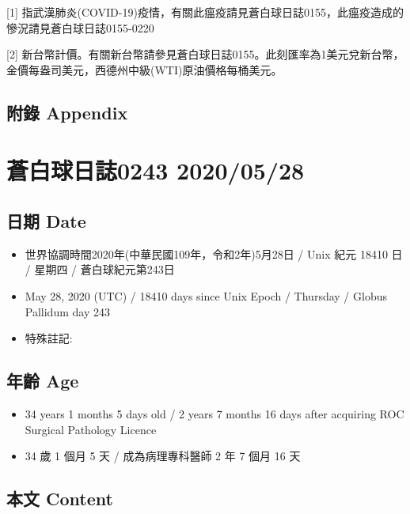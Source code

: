 \documentclass[
]{article}
\providecommand{\tightlist}{%
  \setlength{\itemsep}{0pt}\setlength{\parskip}{0pt}}
\begin{document}
{[}1{]}
指武漢肺炎(COVID-19)疫情，有關此瘟疫請見蒼白球日誌0155，此瘟疫造成的慘況請見蒼白球日誌0155-0220

{[}2{]}
新台幣計價。有關新台幣請參見蒼白球日誌0155。此刻匯率為1美元兌新台幣，金價每盎司美元，西德州中級(WTI)原油價格每桶美元。

\hypertarget{ux9644ux9304-appendix-26}{%
\subsection{附錄 Appendix}\label{ux9644ux9304-appendix-26}}

\hypertarget{ux84bcux767dux7403ux65e5ux8a8c0243-20200528}{%
\section{蒼白球日誌0243
2020/05/28}\label{ux84bcux767dux7403ux65e5ux8a8c0243-20200528}}

\hypertarget{ux65e5ux671f-date-27}{%
\subsection{日期 Date}\label{ux65e5ux671f-date-27}}

\begin{itemize}
\tightlist
\item
  世界協調時間2020年(中華民國109年，令和2年)5月28日 / Unix 紀元 18410 日
  / 星期四 / 蒼白球紀元第243日
\item
  May 28, 2020 (UTC) / 18410 days since Unix Epoch / Thursday / Globus
  Pallidum day 243
\item
  特殊註記:
\end{itemize}

\hypertarget{ux5e74ux9f61-age-27}{%
\subsection{年齡 Age}\label{ux5e74ux9f61-age-27}}

\begin{itemize}
\tightlist
\item
  34 years 1 months 5 days old / 2 years 7 months 16 days after
  acquiring ROC Surgical Pathology Licence
\item
  34 歲 1 個月 5 天 / 成為病理專科醫師 2 年 7 個月 16 天
\end{itemize}

\hypertarget{ux672cux6587-content-27}{%
\subsection{本文 Content}\label{ux672cux6587-content-27}}
\end{document}
